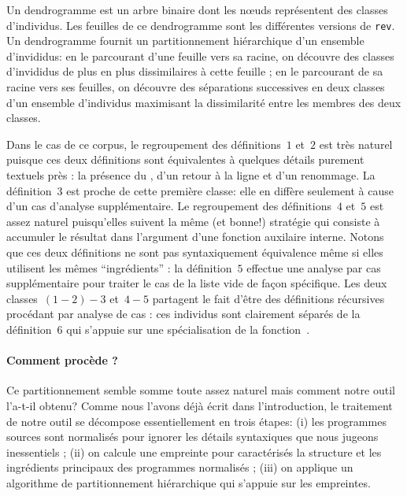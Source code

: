 Un dendrogramme est un arbre binaire dont les n{\oe}uds représentent
des classes d'individus. Les feuilles de ce dendrogramme sont les
différentes versions de \texttt{rev}. Un dendrogramme fournit un
partitionnement hiérarchique d'un ensemble d'invididus: en le
parcourant d'une feuille vers sa racine, on découvre des classes
d'invididus de plus en plus dissimilaires à cette feuille ; en le
parcourant de sa racine vers ses feuilles, on découvre des séparations
successives en deux classes d'un ensemble d'individus maximisant
la dissimilarité entre les membres des deux classes. 

Dans le cas de ce corpus, le regroupement des définitions~$1$ et~$2$
est très naturel puisque ces deux définitions sont équivalentes à
quelques détails purement textuels près : la présence du \iocaml{|},
d'un retour à la ligne et d'un renommage. La définition~$3$ est proche
de cette première classe: elle en diffère seulement à cause d'un cas
d'analyse supplémentaire. Le regroupement des définitions~$4$ et~$5$
est assez naturel puisqu'elles suivent la même (et bonne!) stratégie
qui consiste à accumuler le résultat dans l'argument d'une fonction
auxilaire interne. Notons que ces deux définitions ne sont pas
syntaxiquement équivalence même si elles utilisent les mêmes ``ingrédients'' :
la définition~$5$ effectue une analyse par cas supplémentaire pour
traiter le cas de la liste vide de façon spécifique. Les deux classes~$(1-2)-3$
et~$4-5$ partagent le fait d'être des définitions récursives procédant par
analyse de cas : ces individus sont clairement séparés de la définition~$6$
qui s'appuie sur une spécialisation de la fonction~.

\paragraph{Comment procède {\Asak}?}
Ce partitionnement semble somme toute assez naturel mais comment notre
outil l'a-t-il obtenu? Comme nous l'avons déjà écrit dans
l'introduction, le traitement de notre outil se décompose
essentiellement en trois étapes: (i) les programmes sources sont
normalisés pour ignorer les détails syntaxiques que nous jugeons
inessentiels ; (ii) on calcule une empreinte pour caractérisés la
structure et les ingrédients principaux des programmes normalisés ;
(iii) on applique un algorithme de partitionnement hiérarchique qui
s'appuie sur les empreintes.

